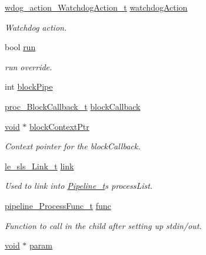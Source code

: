 \begin{DoxyCompactItemize}
\hyperlink{daemons_2linux_2supervisor_2watchdog_action_8h_a564b482466482512da0352e768e90852}{wdog\+\_\+action\+\_\+\+Watchdog\+Action\+\_\+t} \hyperlink{struct_process__t_a90a4e6ee6ab1082b4de0e1bfa5d3a31e}{watchdog\+Action}
\begin{DoxyCompactList}\small\item\em Watchdog action. \end{DoxyCompactList}\item 
bool \hyperlink{struct_process__t_ae23e1715ab2b4297ab3b41b95cdce2bf}{run}
\begin{DoxyCompactList}\small\item\em run override. \end{DoxyCompactList}\item 
int \hyperlink{struct_process__t_a9397d79212672a8b5a6737371e258f1c}{block\+Pipe}
\item 
\hyperlink{proc_8h_aaf793926bc4dcaac12c4668929f32174}{proc\+\_\+\+Block\+Callback\+\_\+t} \hyperlink{struct_process__t_afd5bad905256649315e9a1dd2c3e5dc2}{block\+Callback}
\item 
\hyperlink{_t_e_m_p_l_a_t_e__cdef_8h_ac9c84fa68bbad002983e35ce3663c686}{void} $\ast$ \hyperlink{struct_process__t_aab380c27314db4d94f8212db22ae4472}{block\+Context\+Ptr}
\begin{DoxyCompactList}\small\item\em Context pointer for the block\+Callback. \end{DoxyCompactList}\item 
\hyperlink{structle__sls___link__t}{le\+\_\+sls\+\_\+\+Link\+\_\+t} \hyperlink{struct_process__t_ab49b4e9b6dd64d01bacfcb9ab185ced0}{link}
\begin{DoxyCompactList}\small\item\em Used to link into \hyperlink{struct_pipeline__t}{Pipeline\+\_\+t}\textquotesingle{}s process\+List. \end{DoxyCompactList}\item 
\hyperlink{pipeline_8h_a53e3ab7501d0fbda2b26eef532d81522}{pipeline\+\_\+\+Process\+Func\+\_\+t} \hyperlink{struct_process__t_a0a0819cb859d3c1ea4a3149d6f83e776}{func}
\begin{DoxyCompactList}\small\item\em Function to call in the child after setting up stdin/out. \end{DoxyCompactList}\item 
\hyperlink{_t_e_m_p_l_a_t_e__cdef_8h_ac9c84fa68bbad002983e35ce3663c686}{void} $\ast$ \hyperlink{struct_process__t_a8bb1350a9961c9447e1aabf833355cb1}{param}

\end{DoxyCompactItemize}
